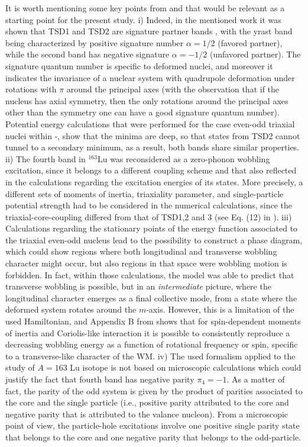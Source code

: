 \documentclass[%
 reprint,
 amsmath,
 amssymb,
 aps,
 floatfix,
]{revtex4-2}
\begin{document}
It is worth mentioning some key points from \cite{raduta2020towards} and \cite{raduta2020new} that would be relevant as a starting point for the present study. i) Indeed, in the mentioned work it was shown that TSD1 and TSD2 are signature partner bands \cite{sun1994varied}, with the yrast band being characterized by positive signature number $\alpha=1/2$ (favored partner), while the second band has negative signature $\alpha=-1/2$ (unfavored partner). The signature quantum number is specific to deformed nuclei, and moreover it indicates the invariance of a nuclear system with quadrupole deformation under rotations with $\pi$ around the principal axes (with the observation that if the nucleus has axial symmetry, then the only rotations around the principal axes other than the symmetry one can have a good signature quantum number). Potential energy calculations that were performed for the case even-odd triaxial nuclei within \cite{raduta2016specific}-\cite{raduta2017semiclassical}, show that the minima are deep, so that states from TSD2 cannot tunnel to a secondary minimum, as a result, both bands share similar properties. ii) The fourth band in $^{163}$Lu was reconsidered as a zero-phonon wobbling excitation, since it belongs to a different coupling scheme and that also reflected in the calculations regarding the excitation energies of its states. More precisely, a different sets of moments of inertia, triaxiality parameter, and single-particle potential strength had to be considered in the numerical calculations, since the triaxial-core-coupling differed from that of TSD1,2 and 3 (see Eq. (12) in \cite{raduta2020new}). iii) Calculations regarding the stationary points of the energy function associated to the triaxial even-odd nucleus lead to the possibility to construct a phase diagram, which could show regions where both longitudinal and transverse wobbling character might occur, but also regions in that space were wobbling motion is forbidden. In fact, within those calculations, the model was able to predict that transverse wobbling is possible, but in an \emph{intermediate} picture, where the longitudinal character emerges as a final collective mode, from a state where the deformed system rotates around the $m$-axis. However, this is a limitation of the used Hamiltonian, and Appendix B from \cite{raduta2020new} shows that for spin-dependent moments of inertia and Coriolis-like interaction it is possible to consistently reproduce a decreasing wobbling energy as a function of rotational frequency or spin, specific to a transverse-like character of the WM. iv) The used formalism applied to the study of $A=163$ Lu isotope is not based on microscopic calculations which could justify the fact that fourth band has negative parity $\pi_4=-1$. As a matter of fact, the parity of the odd system is given by the product of parities associated to the core and the single particle (i.e., positive parity attributed to the core and negative parity that is attributed to the valance nucleon). From a microscopic point of view, the particle-hole excitations involve one positive single parity state that belongs to the core and one negative parity that belongs to the odd-particle.
\end{document}
